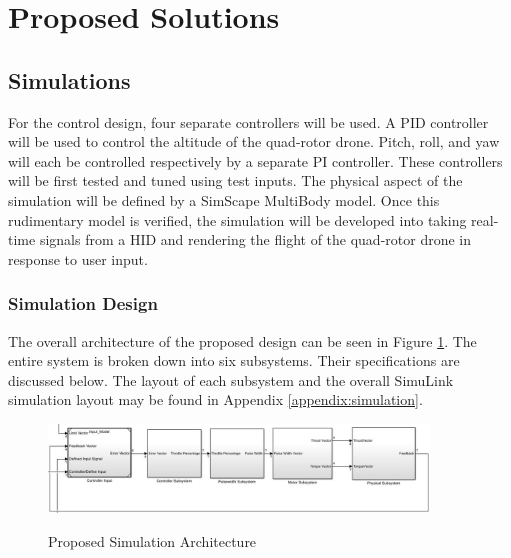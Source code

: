 
\section{Proposed Solutions}
\label{proposed:simulations}
\subsection{Simulations}
For the control design, four separate controllers will be used.  A PID controller will be used to control the altitude of the quad-rotor drone.  Pitch, roll, and yaw will each be controlled respectively by a separate PI controller. These controllers will be first tested and tuned using test inputs.  The physical aspect of the simulation will be defined by a SimScape MultiBody model.  Once this rudimentary model is verified, the simulation will be developed into taking real-time signals from a HID and rendering the flight of the quad-rotor drone in response to user input.

\subsubsection{Simulation Design}
The overall architecture of the proposed design can be seen in Figure \ref{fig:sim_arch}.  The entire system is broken down into six subsystems.  Their specifications are discussed below.  The layout of each subsystem and the overall SimuLink simulation layout may be found in Appendix \ref{appendix:simulation}.

\begin{figure}[H]
	\centering
	\includegraphics[width=0.9\textwidth]{system_arch.jpg}
	\label{fig:sim_arch}
	\caption{Proposed Simulation Architecture}
\end{figure}

